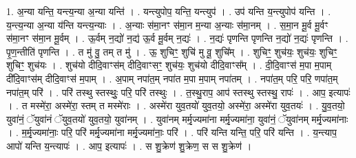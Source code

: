 \documentclass[17pt]{extarticle}
\begin{document}
1. अ॒न्या यन्ति॒ यन्त्य॒न्या अ॒न्या यन्ति॑ । . यन्त्युपोप॒ यन्ति॒ यन्त्युप॑ । . उप॑ यन्ति य॒न्त्युपोप॑ यन्ति । . य॒न्त्य॒न्या अ॒न्या य॑न्ति यन्त्य॒न्याः । . अ॒न्याः स॑मा॒नꣳ स॑मा॒न म॒न्या अ॒न्याः स॑मा॒नम् । . स॒मा॒न मू॒र्व मू॒र्वꣳ स॑मा॒नꣳ स॑मा॒न मू॒र्वम् । . ऊ॒र्वम् न॒द्यो॑ न॒द्य॑ ऊ॒र्व मू॒र्वम् न॒द्यः॑ । . न॒द्यः॑ पृणन्ति पृणन्ति न॒द्यो॑ न॒द्यः॑ पृणन्ति । . पृ॒ण॒न्तीति॑ पृणन्ति । . त मु॑ वु॒ तम् त मु॑ । . ऊ॒ शुचिꣳ॒॒ शुचि॑ मु वू॒ शुचि᳚म् । . शुचिꣳ॒॒ शुच॑यः॒ शुच॑यः॒ शुचिꣳ॒॒ शुचिꣳ॒॒ शुच॑यः । . शुच॑यो दीदि॒वाꣳस॑म् दीदि॒वाꣳसꣳ॒॒ शुच॑यः॒ शुच॑यो दीदि॒वाꣳस᳚म् । . दी॒दि॒वाꣳस॑ म॒पा म॒पाम् दी॑दि॒वाꣳस॑म् दीदि॒वाꣳस॑ म॒पाम् । . अ॒पाम् नपा॑त॒म् नपा॑त म॒पा म॒पाम् नपा॑तम् । . नपा॑त॒म् परि॒ परि॒ णपा॑त॒म् नपा॑त॒म् परि॑ । . परि॑ तस्थु स्तस्थुः॒ परि॒ परि॑ तस्थुः । . त॒स्थु॒राप॒ आप॑ स्तस्थु स्तस्थु॒ रापः॑ । . आप॒ इत्यापः॑ । . त मस्मे॑रा॒ अस्मे॑रा॒ स्तम् त मस्मे॑राः । . अस्मे॑रा युव॒तयो॑ युव॒तयो॒ अस्मे॑रा॒ अस्मे॑रा युव॒तयः॑ । . यु॒व॒तयो॒ युवा॑नं॒ ॅयुवा॑नं ॅयुव॒तयो॑ युव॒तयो॒ युवा॑नम् । . युवा॑नम् मर्मृ॒ज्यमा॑ना मर्मृ॒ज्यमा॑ना॒ युवा॑नं॒ ॅयुवा॑नम् मर्मृ॒ज्यमा॑नाः । . म॒र्मृ॒ज्यमा॑नाः॒ परि॒ परि॑ मर्मृ॒ज्यमा॑ना मर्मृ॒ज्यमा॑नाः॒ परि॑ । . परि॑ यन्ति यन्ति॒ परि॒ परि॑ यन्ति । . य॒न्त्याप॒ आपो॑ यन्ति य॒न्त्यापः॑ । . आप॒ इत्यापः॑ । . स शु॒क्रेण॑ शु॒क्रेण॒ स स शु॒क्रेण॑ । \newline
\end{document}
